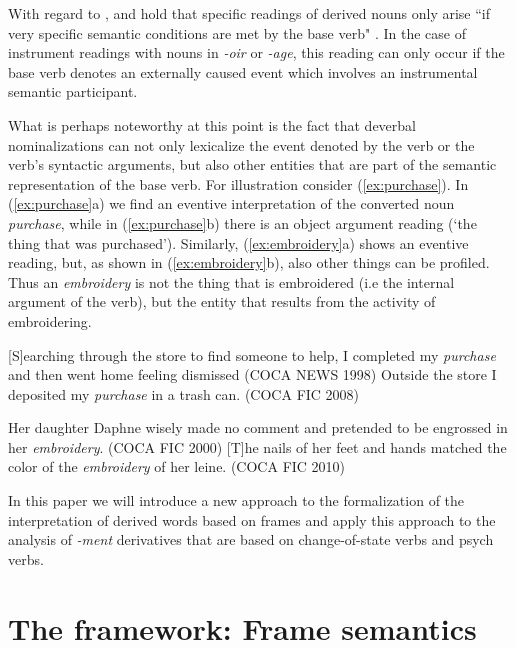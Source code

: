 \documentclass[output=paper]{langsci/langscibook}
\begin{document}
With regard to , \cite{Ferret.2013} and \cite{Ferret.2015} hold that specific readings of derived nouns only arise ``if very specific semantic conditions are met by the base verb" \citep[480]{Ferret.2015}. In the case of instrument readings with nouns in \textit{-oir} or \textit{-age}, this reading can only occur if the base verb denotes an externally caused event which involves an instrumental semantic participant.

What is perhaps noteworthy at this point is the fact that deverbal nominalizations can not only lexicalize the event denoted by the verb or the verb's syntactic arguments, but also other entities that are part of the semantic representation of the base verb. For illustration consider (\ref{ex:purchase}). In (\ref{ex:purchase}a) we find an eventive interpretation of the converted noun \textit{purchase}, while in (\ref{ex:purchase}b) there is an object argument reading (`the thing that was purchased'). Similarly, (\ref{ex:embroidery}a) shows an eventive reading, but, as shown in (\ref{ex:embroidery}b), also other things can be profiled. Thus an \textit{embroidery} is not the thing that is embroidered (i.e the internal argument of the verb), but the entity that results from the activity of embroidering.


\begin{exe}
	\ex \label{ex:purchase}
	\begin{xlist}
		\ex  {}[S]earching through the store to find someone to help, I completed my \emph{purchase} and then went home feeling dismissed (COCA NEWS 1998)
		\ex Outside the store I deposited my \emph{purchase} in a trash can. (COCA FIC 2008)
		\end{xlist}
	\ex \label{ex:embroidery}
	\begin{xlist}
		\ex Her daughter Daphne wisely made no comment and pretended to be engrossed in her \emph{embroidery}. (COCA FIC 2000)
		\ex {}[T]he nails of her feet and hands matched the color of the \emph{embroidery} of her leine. (COCA FIC 2010)
	\end{xlist}
\end{exe}

In this paper we will introduce a new approach to the formalization of the interpretation of derived words based on frames and apply this approach to the analysis of \textit{-ment} derivatives that are based on change-of-state verbs and psych verbs.

\section{The framework: Frame semantics}
\end{document}
